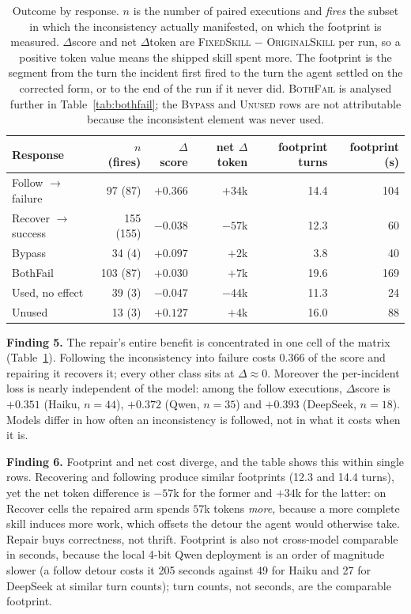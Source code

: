 \begin{table}[t]
\centering\small
\caption{Outcome by response. $n$ is the number of paired executions and \emph{fires} the subset in
which the inconsistency actually manifested, on which the footprint is measured. $\Delta$score and net
$\Delta$token are \textsc{FixedSkill} $-$ \textsc{OriginalSkill} per run, so a positive token value
means the shipped skill spent more. The footprint is the segment from the turn the incident first
fired to the turn the agent settled on the corrected form, or to the end of the run if it never did.
\textsc{BothFail} is analysed further in Table~\ref{tab:bothfail}; the \textsc{Bypass} and
\textsc{Unused} rows are not attributable because the inconsistent element was never used.}
\label{tab:outcome}
\begin{tabular}{@{}lrrrrr@{}}
\toprule
Response & $n$ (fires) & $\Delta$score & net $\Delta$token & footprint turns & footprint (s) \\
\midrule
Follow $\rightarrow$ failure  & 97 (87)  & $+0.366$ & $+34$k & 14.4 & 104 \\
Recover $\rightarrow$ success & 155 (155) & $-0.038$ & $-57$k & 12.3 & 60 \\
Bypass                        & 34 (4)   & $+0.097$ & $+2$k  &  3.8 & 40 \\
BothFail                      & 103 (87) & $+0.030$ & $+7$k  & 19.6 & 169 \\
Used, no effect               & 39 (3)   & $-0.047$ & $-44$k & 11.3 & 24 \\
Unused                        & 13 (3)   & $+0.127$ & $+4$k  & 16.0 & 88 \\
\bottomrule
\end{tabular}
\end{table}

\textbf{Finding 5.} The repair's entire benefit is concentrated in one cell of the matrix
(Table~\ref{tab:outcome}). Following the inconsistency into failure costs $0.366$ of the score and
repairing it recovers it; every other class sits at $\Delta \approx 0$. Moreover the per-incident loss
is nearly independent of the model: among the follow executions, $\Delta$score is $+0.351$ (Haiku,
$n{=}44$), $+0.372$ (Qwen, $n{=}35$) and $+0.393$ (DeepSeek, $n{=}18$). Models differ in how often
an inconsistency is followed, not in what it costs when it is.

\textbf{Finding 6.} Footprint and net cost diverge, and the table shows this within single rows.
Recovering and following produce similar footprints (12.3 and 14.4 turns), yet the net token
difference is $-57$k for the former and $+34$k for the latter: on Recover cells the repaired arm
spends $57$k tokens \emph{more}, because a more complete skill induces more work, which offsets the
detour the agent would otherwise take. Repair buys correctness, not thrift. Footprint is also not
cross-model comparable in seconds, because the local 4-bit Qwen deployment is an order of magnitude
slower (a follow detour costs it 205 seconds against 49 for Haiku and 27 for DeepSeek at similar turn
counts); turn counts, not seconds, are the comparable footprint.


